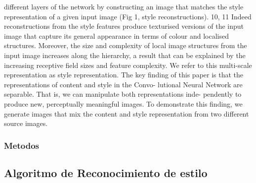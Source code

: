 \documentclass[a4paper,10pt]{article}
\begin{document}
different layers of the network by constructing an image that matches the style representation
of a given input image (Fig 1, style reconstructions). 10, 11 Indeed reconstructions from the style
features produce texturised versions of the input image that capture its general appearance in
terms of colour and localised structures. Moreover, the size and complexity of local image
structures from the input image increases along the hierarchy, a result that can be explained
by the increasing receptive field sizes and feature complexity. We refer to this multi-scale
representation as style representation.
The key finding of this paper is that the representations of content and style in the Convo-
lutional Neural Network are separable. That is, we can manipulate both representations inde-
pendently to produce new, perceptually meaningful images. To demonstrate this finding, we
generate images that mix the content and style representation from two different source images.
    \subsubsection{Metodos}
    
  \subsection{Algoritmo de Reconocimiento de estilo}
\end{document}
